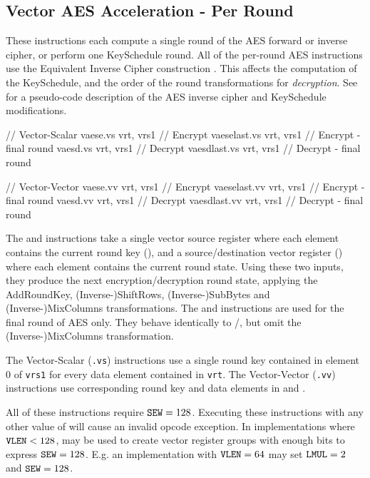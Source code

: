 
\subsection{Vector AES Acceleration - Per Round}
\label{sec:vector:aes:single-round}

These instructions each compute a single round of the AES forward
or inverse cipher, or perform one KeySchedule round.
All of the per-round AES instructions use the Equivalent Inverse Cipher
construction \cite[Section 5.3.5]{nist:fips:197}.
This affects the computation of the KeySchedule, and the order of the
round transformations for {\em decryption}.
See \cite[Figure 15]{nist:fips:197} for a pseudo-code description
of the AES inverse cipher and KeySchedule modifications.

\begin{cryptoisa}
// Vector-Scalar
vaese.vs        vrt, vrs1        // Encrypt
vaeselast.vs    vrt, vrs1        // Encrypt - final round
vaesd.vs        vrt, vrs1        // Decrypt
vaesdlast.vs    vrt, vrs1        // Decrypt - final round

// Vector-Vector
vaese.vv        vrt, vrs1        // Encrypt
vaeselast.vv    vrt, vrs1        // Encrypt - final round
vaesd.vv        vrt, vrs1        // Decrypt
vaesdlast.vv    vrt, vrs1        // Decrypt - final round
\end{cryptoisa}

The  and  instructions take
a single vector source register where each element contains the
current round key (),
and
a source/destination vector register (\vrt) where each element contains
the current round state.
Using these two inputs, they produce the next encryption/decryption
round state, applying the 
AddRoundKey, (Inverse-)ShiftRows, (Inverse-)SubBytes and (Inverse-)MixColumns
transformations.
The  and  instructions
are used for the final round of AES only.
They behave identically to /, but
omit the (Inverse-)MixColumns transformation.

The Vector-Scalar ({\tt *.vs}) instructions use a single round key
contained in element $0$ of {\tt vrs1} for every data element
contained in {\tt vrt}.
The Vector-Vector ({\tt *.vv}) instructions use corresponding
round key and data elements in  and \vrt.

All of these instructions require ${\tt SEW}=128$.
Executing these instructions with any other value of \SEW will cause
an invalid opcode exception.
In implementations where ${\tt VLEN}<128$, \LMUL may be used to create
vector register groups with enough bits to express ${\tt SEW}=128$.
E.g. an implementation with ${\tt VLEN}=64$ may set ${\tt LMUL}=2$ and ${\tt SEW}=128$.

